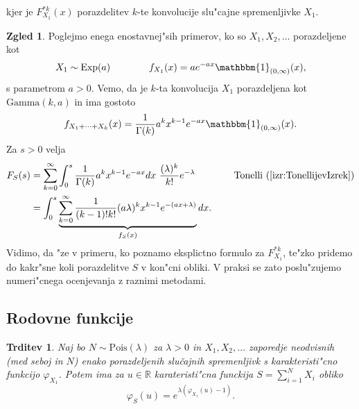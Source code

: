 \documentclass[12pt, a4paper, reqno]{amsart}
\theoremstyle{definition}
\newtheorem{zgled}[definicija]{Zgled}
\theoremstyle{plain}
\newtheorem{trditev}[definicija]{Trditev}
\newcommand{\R}{\mathbb{R}}
\newcommand{\1}{\mathds{1}}
\newcommand{\Pois}[1]{\text{Pois}(#1)}
\begin{document}
    \noindent
    kjer je $F_{X_1}^{*k}(x)$ porazdelitev $k$-te konvolucije slu"cajne spremenljivke $X_1$.
    
    \begin{zgled}
        Poglejmo enega enostavnej"sih primerov, ko so $X_1, X_2, \dots$ porazdeljene kot
        \begin{equation*}
            X_1\sim\text{Exp}(a) \qquad \qquad f_{X_1}(x) = a e^{-a x}\mathbbm{1}_{(0, \infty)}(x),
        \end{equation*}
        s parametrom $a>0$. Vemo, da je $k$-ta 
        konvolucija $X_1$ porazdeljena kot \newline $\text{Gamma}(k, a)$ in ima gostoto
        \begin{equation*}
            f_{X_1 + \cdots + X_k}(x) = \frac{1}{\Gamma(k)}a^kx^{k-1}e^{-a x}\mathbbm{1}_{(0, \infty)}(x).
        \end{equation*}
        Za $s>0$ velja
        \begin{align*}
            F_{S}(s) 
            &= \sum_{k=0}^\infty \int_0^s\frac{1}{\Gamma(k)}a^kx^{k-1}e^{-ax}dx \ \frac{(\lambda )^k}{k!}e^{-\lambda }
            \qquad \qquad \text{Tonelli} \ (\ref{izr:TonellijevIzrek}) \\
            &= \int_0^s\underbrace{\sum_{k=0}^\infty \frac{1}{(k-1)!k!}(a\lambda)^kx^{k-1}e^{-(ax + \lambda)}}_{f_S(x)}dx.
        \end{align*}
        Vidimo, da "ze v primeru, ko poznamo eksplictno formulo za $F^{*k}_{X_1}$, te"zko pridemo do 
        kakr"sne koli porazdelitve $S$ v kon"cni obliki. V praksi se zato poslu"zujemo numeri"cnega 
        ocenjevanja z raznimi metodami.
        \label{zgd:sestavljenaPoissonovaPorazdelitevGamma}
    \end{zgled}

    \subsection{Rodovne funkcije}

    \begin{trditev}
        Naj bo $N\sim \Pois{\lambda}$  za $\lambda >0$ in $X_1, X_2, \dots$ zaporedje neodvisnih (med seboj in $N$)
        enako porazdeljenih slučajnih spremenljivk s karakteristi"cno funkcijo $\varphi_{X_1}$. Potem ima za $u\in\R$
        karateristi"cna funckija $S = \sum_{i=1}^NX_i$ obliko
        \begin{equation*}
            \varphi_{S}(u) = e^{\lambda \left(\varphi_{X_1}(u) - 1\right)}.
        \end{equation*}
        \label{trd:MomentGener}
    \end{trditev}
    
\end{document}
